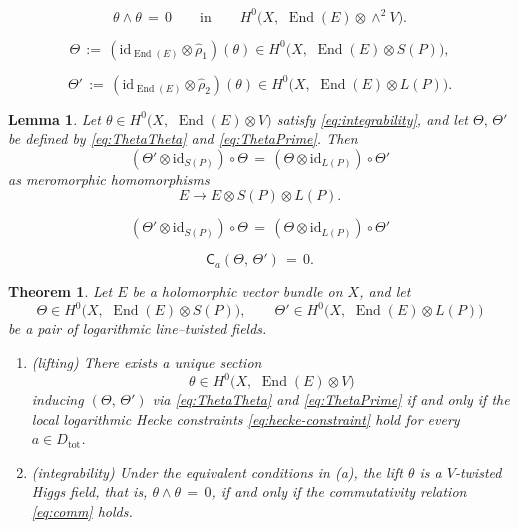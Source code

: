 \documentclass[10pt,a4paper]{amsart}
\newtheorem{lemma}{Lemma}
\newtheorem{theorem}{Theorem}
\newcommand{\End}{\operatorname{End}}
\newcommand{\id}{\mathrm{id}}
\begin{document}
\begin{equation}\label{eq:integrability}
\theta\wedge\theta\,=\,0
\qquad\text{in}\qquad
H^0\bigl(X,\,\, \End(E)\otimes \wedge^2V\bigr).
\end{equation}

\begin{equation}\label{eq:ThetaTheta}
\Theta\,:=\,(\id_{\End(E)}\otimes \widehat{\rho}_1)(\theta)\in H^0\bigl(X,\,\, \End(E)\otimes S(P)\bigr),
\end{equation}

\begin{equation}\label{eq:ThetaPrime}
\Theta'\,:=\,(\id_{\End(E)}\otimes \widehat{\rho}_2)(\theta)\in H^0\bigl(X,\,\, \End(E)\otimes L(P)\bigr).
\end{equation}

\begin{lemma}\label{lem:comm}
Let \(\theta\in H^0\bigl(X,\,\, \End(E)\otimes V\bigr)\) satisfy \eqref{eq:integrability}, and let \(\Theta,\,\Theta'\) be defined by \eqref{eq:ThetaTheta} and \eqref{eq:ThetaPrime}.  Then
\begin{equation}\label{eq:comm}
(\Theta'\otimes \id_{S(P)})\circ \Theta
\,=\,
(\Theta\otimes \id_{L(P)})\circ \Theta'
\end{equation}
as meromorphic homomorphisms
\[
E\longrightarrow E\otimes S(P)\otimes L(P).
\]
\end{lemma}

\begin{equation}
(\Theta'\otimes \id_{S(P)})\circ \Theta
\,=\,
(\Theta\otimes \id_{L(P)})\circ \Theta'
\end{equation}

\begin{equation}\label{eq:hecke-constraint}
\mathsf{C}_a(\Theta,\,\Theta')\,=\,0.
\end{equation}

\begin{theorem}\label{thm:A}
Let \(E\) be a holomorphic vector bundle on \(X\), and let
\[
\Theta\in H^0\bigl(X,\,\, \End(E)\otimes S(P)\bigr),\qquad
\Theta'\in H^0\bigl(X,\,\, \End(E)\otimes L(P)\bigr)
\]
be a pair of logarithmic line--twisted fields.

\begin{enumerate}
\item[(a)] \textup{(lifting)} There exists a unique section
\[
\theta\in H^0\bigl(X,\,\, \End(E)\otimes V\bigr)
\]
inducing \((\Theta,\,\Theta')\) via \eqref{eq:ThetaTheta} and \eqref{eq:ThetaPrime} if and only if the local logarithmic Hecke constraints \eqref{eq:hecke-constraint} hold for every \(a\in D_{\mathrm{tot}}\).

\item[(b)] \textup{(integrability)} Under the equivalent conditions in \textup{(a)}, the lift \(\theta\) is a \(V\)-twisted Higgs field, that is, \(\theta\wedge\theta\,=\,0\), if and only if the commutativity relation \eqref{eq:comm} holds.
\end{enumerate}
\end{theorem}
\end{document}
